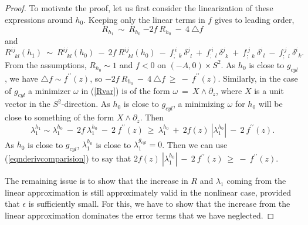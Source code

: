 \begin{proof}
To motivate the proof, let us first consider the linearization of these expressions around
$h_0$. Keeping only the linear terms in $f$ gives
to leading order,
\begin{equation}
R_{h_1} \: \sim \: R_{h_0} \:  {-2f} \:  R_{h_0} \:  - \: 4 \: \triangle f
\end{equation}
and
\begin{equation}
R^{ij}_{\: \: \: kl}(h_1) \:  \sim \: R^{ij}_{\: \: \: kl}(h_0) \: - \: {2f} \:  R^{ij}_{\: \: \: kl}(h_0)
\: - \: {f}^{ \: i}_{; \: \: k} \:  \delta^j_{\: \: l}
\: + \: {f}^{ \: i}_{; \: \: l} \:  \delta^j_{\: \: k}
\: + \: {f}^{ \: j}_{; \: \: k} \:  \delta^i_{\: \: l}
\: - \: {f}^{ \: j}_{; \: \: l} \:  \delta^i_{\: \: k}.
\end{equation}
From the assumptions, $R_{h_0} \sim 1$ and $f < 0$ on $(-A,0) \times S^2$.
As $h_0$ is close to $g_{cyl}$, we have $\triangle f \sim f^{\prime \prime}(z)$,
so ${-2f} \:  R_{h_0} \:  - \: 4 \: \triangle f \: \ge \: - \: f^{\prime \prime}(z)$.
Similarly, in the case of $g_{cyl}$ a minimizer
$\omega$ in (\ref{Rvar}) is of the  form $\omega \: = \: X \wedge \partial_z$,
where $X$ is a unit vector in the $S^2$-direction.  As $h_0$ is close to
$g_{cyl}$, a minimizing $\omega$ for $h_0$ will be close to something of
the form $X \wedge \partial_z$. Then
\begin{equation}
\lambda_1^{h_1} \sim \lambda_1^{h_0} \: - \: 2f \: \lambda_1^{h_0}\: - \: 2 \:
f^{\prime \prime}(z) \: \ge \: \lambda_1^{h_0} \: + \: 2 f(z) \: |\lambda_1^{h_0}|\: - \: 2 \:
f^{\prime \prime}(z).
\end{equation}
As $h_0$ is close to $g_{cyl}$, $\lambda_1^{h_0}$ is close to
$\lambda_1^{g_{cyl}} = 0$. Then we can
use (\ref{eqnderivcomparision}) to say that $2 f(z) \: |\lambda_1^{h_0}|\: - \: 2 \:
f^{\prime \prime}(z) \: \ge \: - \: f^{\prime \prime}(z)$.

The remaining issue is to show that the increase in $R$ and $\lambda_1$
coming from the linear approximation is still approximately valid in the
nonlinear case, provided that $\epsilon$ is sufficiently small. For this,
we have to show that the increase from the linear approximation dominates
the error terms that we have neglected.


\end{proof}

